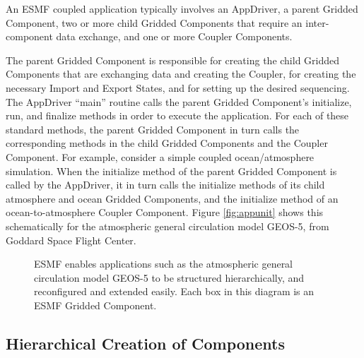 An ESMF coupled application typically involves an AppDriver, a parent 
Gridded Component, two or more child Gridded Components that require 
an inter-component data exchange, and one or more Coupler 
Components. 

The parent Gridded Component is responsible for creating the child 
Gridded Components that are exchanging data and creating the Coupler, 
for creating the necessary Import and Export States, and for 
setting up the desired sequencing.  The AppDriver ``main'' routine
calls the parent Gridded Component's initialize, run, and finalize 
methods in order to execute the application.  For each of these
standard methods, the parent Gridded Component in turn calls the 
corresponding methods in the child Gridded Components and the 
Coupler Component.  For example, consider a simple coupled 
ocean/atmosphere simulation.  When the initialize method of the 
parent Gridded Component is called by the AppDriver, it in turn 
calls the initialize methods of its child atmosphere and ocean 
Gridded Components, and the initialize method of an 
ocean-to-atmosphere Coupler Component.  Figure \ref{fig:appunit}
shows this schematically for the atmospheric general circulation 
model GEOS-5, from Goddard Space Flight Center.

\begin{center}
\begin{figure}
\caption{ESMF enables applications such as the atmospheric general
circulation model GEOS-5 to be structured hierarchically, and 
reconfigured and extended easily.  Each box in this diagram is an
ESMF Gridded Component.}
\label{fig:GEOS5}
\end{figure}
\end{center}

\subsection{Hierarchical Creation of Components}
\label{sec:hierarchy}

